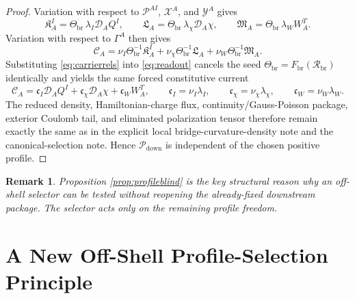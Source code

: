 \documentclass[11pt]{article}
\newcommand{\SpatialD}{\mathcal D}
\newcommand{\ConstCurrent}{\mathcal C}
\newcommand{\ConstGamma}{\Gamma}
\newcommand{\CurvQMult}{\mathscr P}
\newcommand{\CurvChiMult}{\mathscr X}
\newcommand{\CurvTransMult}{\mathscr Y}
\newcommand{\CurvSeed}{\Theta_{\mathrm{br}}}
\newcommand{\CurvProfile}{F_{\mathrm{br}}}
\newcommand{\CurvOneI}{\mathfrak K}
\newcommand{\CurvOneChi}{\mathfrak L}
\newcommand{\CurvOneW}{\mathfrak M}
\newcommand{\BridgeCurv}{\mathcal R_{\mathrm{br}}}
\newcommand{\DownPkg}{\mathscr P_{\mathrm{down}}}
\newtheorem{remark}{Remark}
\begin{document}
\begin{proof}
Variation with respect to \(\CurvQMult^{AI}\), \(\CurvChiMult^A\), and \(\CurvTransMult^A\) gives
\begin{equation}
\CurvOneI_A^I=\CurvSeed\,\lambda_I\SpatialD_AQ^I,
\qquad
\CurvOneChi_A=\CurvSeed\,\lambda_\chi\SpatialD_A\chi,
\qquad
\CurvOneW_A=\CurvSeed\,\lambda_WW_A^T.
\label{eq:carrierrels}
\end{equation}
Variation with respect to \(\ConstGamma^A\) then gives
\begin{equation}
\ConstCurrent_A
=
\nu_I\CurvSeed^{-1}\CurvOneI_A^I
+\nu_\chi\CurvSeed^{-1}\CurvOneChi_A
+\nu_W\CurvSeed^{-1}\CurvOneW_A.
\label{eq:readout}
\end{equation}
Substituting \eqref{eq:carrierrels} into \eqref{eq:readout} cancels the seed \(\CurvSeed=\CurvProfile(\BridgeCurv)\) identically and yields the same forced constitutive current
\begin{equation}
\ConstCurrent_A
=
\mathfrak c_I\SpatialD_AQ^I
+\mathfrak c_\chi\SpatialD_A\chi
+\mathfrak c_WW_A^T,
\qquad
\mathfrak c_I=\nu_I\lambda_I,
\qquad
\mathfrak c_\chi=\nu_\chi\lambda_\chi,
\qquad
\mathfrak c_W=\nu_W\lambda_W.
\label{eq:forcedcurrent}
\end{equation}
The reduced density, Hamiltonian-charge flux, continuity/Gauss-Poisson package, exterior Coulomb tail, and eliminated polarization tensor therefore remain exactly the same as in the explicit local bridge-curvature-density note and the canonical-selection note. Hence \(\DownPkg\) is independent of the chosen positive profile.
\end{proof}

\begin{remark}
Proposition \ref{prop:profileblind} is the key structural reason why an off-shell selector can be tested without reopening the already-fixed downstream package. The selector acts only on the remaining profile freedom.
\end{remark}

\section{A New Off-Shell Profile-Selection Principle}
\end{document}
